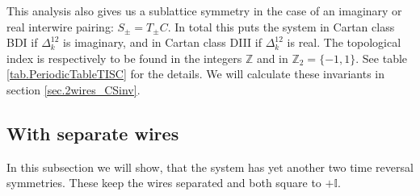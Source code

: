 This analysis also gives us a sublattice symmetry in the case of an imaginary or real interwire pairing: $S_\pm = T_\pm C$. In total this puts the system in Cartan class BDI if $\Delta^{12}_k$ is imaginary, and in Cartan class DIII if $\Delta^{12}_k$ is real. The topological index is respectively to be found in the integers $\mathbb{Z}$ and in $\mathbb{Z}_2 = \{-1,1\}$. See table \ref{tab.PeriodicTableTISC} for the details. We will calculate these invariants in section \ref{sec.2wires_CSinv}. 

\subsection{With separate wires} 
\label{subsec.TRseparatewires}
In this subsection we will show, that the system has yet another two time reversal symmetries. These keep the wires separated and both square to $+\mathbb{I}$. 

